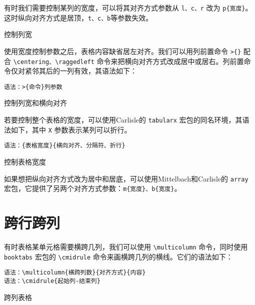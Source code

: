 有时我们需要控制某列的宽度，可以将其对齐方式参数从 \texttt{l、c、r} 改为 \verb|p{宽度}|。这时纵向对齐方式是居顶，\texttt{t、c、b}等参数失效。

\begin{example}[h]
\caption{控制列宽}
\label{tab:width_tab}
\end{example}

使用宽度控制参数之后，表格内容缺省居左对齐。我们可以用列前置命令 \verb|>{}| 配合 
\verb|\centering、\raggedleft| 命令来把横向对齐方式改成居中或居右。列前置命令仅对紧邻其后的一列有效，其语法如下：

\verb|语法：>{命令}列参数|


\begin{example}[h]
\caption{控制列宽和横向对齐}
\label{tab:width_aligned_tab}
\end{example}

若要控制整个表格的宽度，可以使用Carlisle的 \texttt{tabularx} 宏包\citep{Carlisle_1999}的同名环境，其语法如下，其中 \texttt{X} 参数表示某列可以折行。

\verb|语法：{表格宽度}{横向对齐、分隔符、折行}|

\begin{example}[h]
\caption{控制表格宽度}
\label{tab:tabularx_tab}
\end{example}

如果想把纵向对齐方式改为居中和居底，可以使用Mittelbach\indexMittelbach 和Carlisle的 \texttt{array} 宏包\citep{Mittelbach_2009}，它提供了另两个对齐方式参数：\verb|m{宽度}、b{宽度}|。

\section{跨行跨列}

有时表格某单元格需要横跨几列，我们可以使用 \verb|\multicolumn| 命令，同时使用 \texttt{booktabs} 宏包的 \verb|\cmidrule| 命令来画横跨几列的横线。它们的语法如下：

\verb|语法：\multicolumn{横跨列数}{对齐方式}{内容}|\\
\indent\verb|语法：\cmidrule{起始列-结束列}|

\begin{example}[h]
\caption{跨列表格}
\label{tab:multicol_tab}
\end{example}

